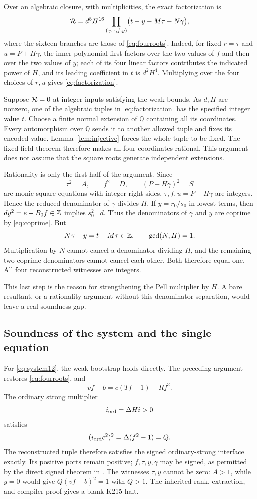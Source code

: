 Over an algebraic closure, with multiplicities, the exact factorization is
\begin{equation}
 \mathcal R=d^8H^{16}
 \prod_{(\gamma,\tau,f,y)}
 \bigl(t-y-M\tau-N\gamma\bigr),\label{eq:factorization}
\end{equation}
where the sixteen branches are those of \eqref{eq:fourroots}.
Indeed, for fixed $r=\tau$ and $u=P+H\gamma$, the inner polynomial first
factors over the two values of $f$ and then over the two values of $y$;
each of its four linear factors contributes the indicated power of $H$,
and its leading coefficient in $t$ is $d^2H^4$. Multiplying over the four
choices of $r,u$ gives \eqref{eq:factorization}.

Suppose $\mathcal R=0$ at integer inputs satisfying the weak bounds. As $d,H$
are nonzero, one of the algebraic tuples in \eqref{eq:factorization} has
the specified integer value $t$. Choose a finite normal extension of
$\mathbb Q$ containing all its coordinates. Every automorphism over
$\mathbb Q$ sends it to another allowed tuple and fixes its encoded value.
Lemma~\ref{lem:injective} forces the whole tuple to be fixed. The fixed
field theorem therefore makes all four coordinates rational. This argument
does not assume that the square roots generate independent extensions.

Rationality is only the first half of the argument. Since
\[
 \tau^2=A,\qquad f^2=D,\qquad (P+H\gamma)^2=S
\]
are monic square equations with integer right sides, $\tau,f,u=P+H\gamma$
are integers. Hence the reduced denominator of $\gamma$ divides $H$.
If $y=r_0/s_0$ in lowest terms, then $dy^2=e-B_0f\in\mathbb Z$ implies
$s_0^2\mid d$. Thus the denominators of $\gamma$ and $y$ are coprime by
\eqref{eq:coprime}. But
\[
 N\gamma+y=t-M\tau\in\mathbb Z,\qquad \gcd(N,H)=1.
\]
Multiplication by $N$ cannot cancel a denominator dividing $H$, and the
remaining two coprime denominators cannot cancel each other. Both therefore
equal one. All four reconstructed witnesses are integers.

This last step is the reason for strengthening the Pell multiplier by $H$.
A bare resultant, or a rationality argument without this denominator
separation, would leave a real soundness gap.

\subsection{Soundness of the system and the single equation}

For \eqref{eq:system12}, the weak bootstrap holds directly. The preceding
argument restores \eqref{eq:fourroots}, and
\[
 vf-b=c(Tf-1)-Rf^2.
\]
The ordinary strong multiplier
\[
 i_{\rm ord}=\Delta Hi>0
\]
satisfies
\[
 (i_{\rm ord}c^2)^2=\Delta(f^2-1)=Q.
\]
The reconstructed tuple therefore satisfies the signed ordinary-strong
interface exactly. Its positive ports remain positive; $f,\tau,y,\gamma$
may be signed, as permitted by the direct signed theorem in
. The witnesses $\tau,y$ cannot be zero:
$A>1$, while $y=0$ would give $Q(vf-b)^2=1$ with $Q>1$.
The inherited rank, extraction, and compiler proof gives a blank K215 halt.

